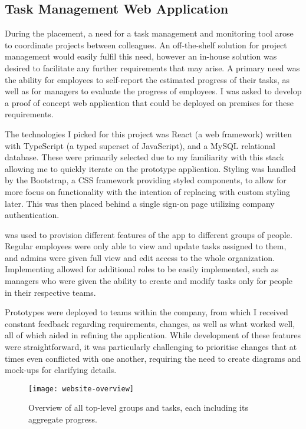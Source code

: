 \subsection{Task Management Web Application}
\label{sec:task-app}

During the placement, a need for a task management and monitoring tool arose to coordinate projects
between colleagues. An off-the-shelf  solution for project management would easily fulfil
this need, however an in-house solution was desired to facilitate any further requirements that may
arise. A primary need was the ability for employees to self-report the estimated progress of their
tasks, as well as for managers to evaluate the progress of employees. I was asked to develop a proof
of concept web application that could be deployed on premises for these requirements.

The technologies I picked for this project was React (a web framework) written with TypeScript (a
typed superset of JavaScript), and a MySQL relational database. These were primarily selected due to
my familiarity with this stack allowing me to quickly iterate on the prototype application. Styling
was handled by the Bootstrap, a CSS framework providing styled components, to allow for more focus
on functionality with the intention of replacing with custom styling later. This was then placed
behind a single sign-on page utilizing company authentication.

 was used to provision different features of the app to different groups of people.
Regular employees were only able to view and update tasks assigned to them, and admins were given
full view and edit access to the whole organization. Implementing  allowed for additional
roles to be easily implemented, such as managers who were given the ability to create and modify
tasks only for people in their respective teams.

Prototypes were deployed to teams within the company, from which I received constant feedback
regarding requirements, changes, as well as what worked well, all of which aided in refining the
application. While development of these features were straightforward, it was particularly
challenging to prioritise changes that at times even conflicted with one another, requiring the need
to create diagrams and mock-ups for clarifying details.

\begin{figure}
    \centering
    \texttt{[image: website-overview]}
    \caption{Overview of all top-level groups and tasks, each including its aggregate
        progress.\label{fig:website-overview}}
\end{figure}

